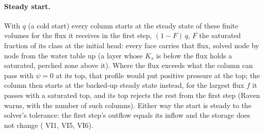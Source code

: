 \paragraph{Steady start.} With  $q$ (a cold start) every column starts at the steady
state of these finite volumes for the flux it receives in the first step, $(1-F)\,q$, $F$ the saturated fraction of its
class at the initial head: every face carries that flux, solved node by node from the water table up (a layer whose
$K_s$ is below the flux holds a saturated, perched zone above it). Where the flux exceeds what the column can pass with
$\psi=0$ at its top, that profile would put positive pressure at the top; the column then starts at the backed-up steady
state instead, for the largest flux $f$ it passes with a saturated top, and its top rejects the rest from the first step
(Raven warns, with the number of such columns). Either way the start is steady to the solver's tolerance: the first
step's outflow equals its inflow and the storage does not change ( VI1, VI5, VI6).

